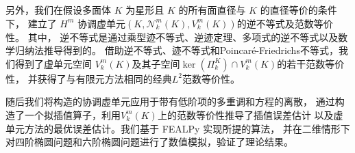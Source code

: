 另外，我们在假设多面体 $K$ 为星形且 $K$ 的所有面直径与 $K$ 的直径等价的条件下，
建立了 $H^m$ 协调虚单元$(K, \mathcal N_k^m(K), V_k^m(K))$的逆不等式及范数等价性。
其中，
逆不等式是通过乘型迹不等式、逆迹定理、多项式的逆不等式以及数学归纳法推导得到的。
借助逆不等式、迹不等式和Poincar\'e-Friedrichs不等式，我们得到了虚单元空间
$V_{k}^{m}(K)$及其子空间$\ker(\Pi_k^K)\cap V_{k}^{m}(K)$的若干范数等价性，
并获得了与有限元方法相同的经典$L^2$范数等价性。

随后我们将构造的协调虚单元应用于带有低阶项的多重调和方程的离散，
通过构造了一个拟插值算子，利用$V_{k}^{m}(K)$上的范数等价性推导了插值误差估计
以及虚单元方法的最优误差估计。我们基于 FEALPy 实现所提的算法，
并在二维情形下对四阶椭圆问题和六阶椭圆问题进行了数值模拟，验证了理论结果。

%

